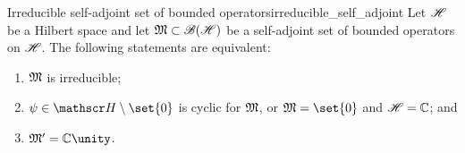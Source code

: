 \begin{proposition}{Irreducible self-adjoint set of bounded operators}{irreducible_self_adjoint}
    Let \(\mathscr{H}\) be a Hilbert space and let \(\mathfrak{M} \subset \mathscr{B}(\mathscr{H})\) be a self-adjoint set of bounded operators on \(\mathscr{H}\). The following statements are equivalent:
    \begin{enumerate}[label=(\alph*)]
        \item \(\mathfrak{M}\) is irreducible;
        \item \(\psi \in \hilbert \setminus \set{0}\) is cyclic for \(\mathfrak{M}\), or \(\algebra{M} = \set{0}\) and \(\mathscr{H} = \mathbb{C}\); and
        \item \(\algebra{M}' = \mathbb{C} \unity\).
    \end{enumerate}
\end{proposition}
